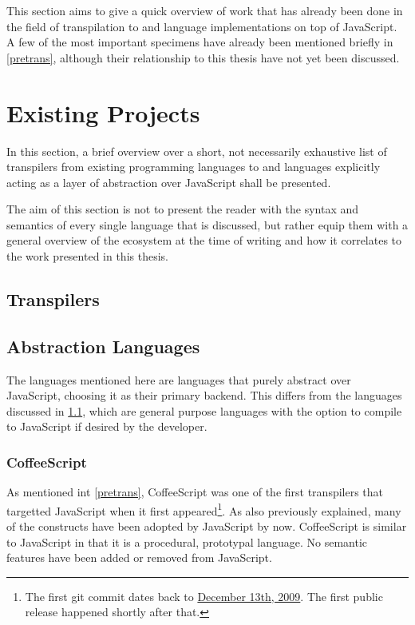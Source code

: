 \documentclass[oneside,11pt,xetex]{scrbook}
\begin{document}
This section aims to give a quick overview of work that has already been done in the
field of transpilation to and language implementations on top of JavaScript. A few
of the most important specimens have already been mentioned briefly in \ref{pretrans},
although their relationship to this thesis have not yet been discussed.

\section{Existing Projects}

In this section, a brief overview over a short, not necessarily exhaustive list of
transpilers from existing programming languages to and languages explicitly
acting as a layer of abstraction over JavaScript shall be presented.

The aim of this section is not to present the reader with the syntax and semantics
of every single language that is discussed, but rather equip them with a general
overview of the ecosystem at the time of writing and how it correlates to the
work presented in this thesis.

\subsection{Transpilers}
\label{trans}

\subsection{Abstraction Languages}

The languages mentioned here are languages that purely abstract over JavaScript,
choosing it as their primary backend. This differs from the languages discussed
in \ref{trans}, which are general purpose languages with the option to compile
to JavaScript if desired by the developer.

\subsubsection{CoffeeScript}

As mentioned int \ref{pretrans}, CoffeeScript was one of the first transpilers
that targetted JavaScript when it first appeared\footnote{The first git commit
dates back to \href{https://github.com/jashkenas/coffeescript/commit/8e9d637985d2dc9b44922076ad54ffef7fa8e9c2}{December 13th, 2009}. The first
public release happened shortly after that.}. As also previously explained,
many of the constructs have been adopted by JavaScript by now. CoffeeScript
is similar to JavaScript in that it is a procedural, prototypal language. No
semantic features have been added or removed from JavaScript.
\end{document}
